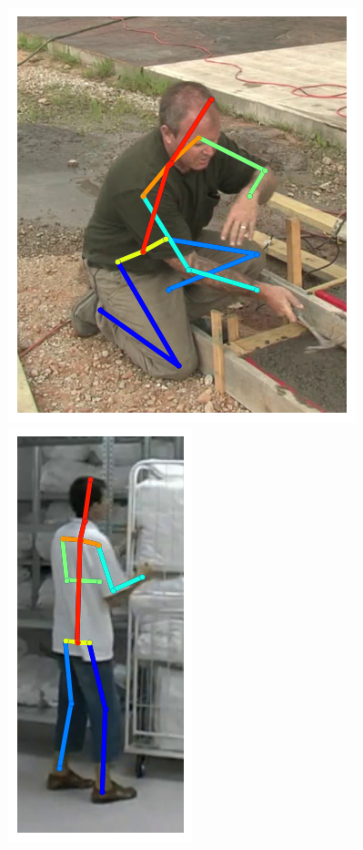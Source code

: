 \begin{figure}[t!]
    \includegraphics[height=\flowhh]{resources/Human_Poses/qualitative/img-4}
    \hfill
    \includegraphics[height=\flowhh]{resources/Human_Poses/qualitative/img-5}
    \hfill

\end{figure}
